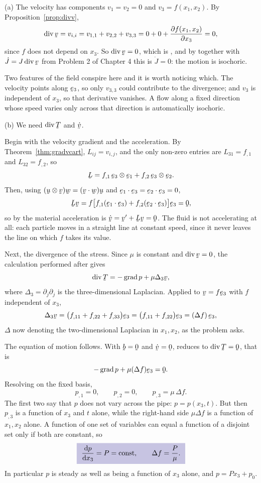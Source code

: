 \begin{solution}
(a) The velocity has components $v_{1}=v_{2}=0$ and
$v_{3}=f(x_{1},x_{2})$. By Proposition~\ref{prop:divv},
\[
   \dvg\bv=v_{i,i}=v_{1,1}+v_{2,2}+v_{3,3}
   =0+0+\frac{\partial f(x_{1},x_{2})}{\partial x_{3}}=0 ,
\]
since $f$ does not depend on $x_{3}$. So $\dvg\bv=0$, which is
, and by  together with $\dot J=J\dvg\bv$ from
Problem 2 of Chapter 4 this is $\dot J=0$: the motion is isochoric.

Two features of the field conspire here and it is worth noticing which.
The velocity points along $\be_{3}$, so only $v_{3,3}$ could contribute
to the divergence; and $v_{3}$ is independent of $x_{3}$, so that
derivative vanishes. A flow along a fixed direction whose speed varies
only across that direction is automatically isochoric.

(b) We need $\dvg\bT$ and $\dot\bv$.

Begin with the velocity gradient and the acceleration. By
Theorem~\ref{thm:gradvcart}, $L_{ij}=v_{i,j}$, and the only non-zero
entries are $L_{31}=f_{,1}$ and $L_{32}=f_{,2}$, so
\[
   \bL=f_{,1}\,\be_{3}\otimes\be_{1}+f_{,2}\,\be_{3}\otimes\be_{2}.
\]
Then, using $(\bu\otimes\bv)\bw=(\ip\bv\bw)\bu$ and
$\ip{\be_{1}}{\be_{3}}=\ip{\be_{2}}{\be_{3}}=0$,
\[
   \bL\bv=f\big[f_{,1}(\ip{\be_{1}}{\be_{3}})
   +f_{,2}(\ip{\be_{2}}{\be_{3}})\big]\be_{3}=\bze ,
\]
so by  the material acceleration is
$\dot\bv=\bv'+\bL\bv=\bze$. The fluid is not accelerating at all: each
particle moves in a straight line at constant speed, since it never
leaves the line on which $f$ takes its value.

Next, the divergence of the stress. Since $\mu$ is constant and
$\dvg\bv=0$, the calculation performed after  gives
\[
   \dvg\bT=-\grad p+\mu\Delta_{3}\bv ,
\]
where $\Delta_{3}=\partial_{j}\partial_{j}$ is the three-dimensional
Laplacian. Applied to $\bv=f\be_{3}$ with $f$ independent of $x_{3}$,
\[
   \Delta_{3}\bv=\big(f_{,11}+f_{,22}+f_{,33}\big)\be_{3}
   =\big(f_{,11}+f_{,22}\big)\be_{3}=(\Delta f)\,\be_{3},
\]
$\Delta$ now denoting the two-dimensional Laplacian in $x_{1},x_{2}$, as
the problem asks.

The equation of motion follows. With $\bb=\bze$ and $\dot\bv=\bze$,
 reduces to $\dvg\bT=\bze$, that is
\[
   -\grad p+\mu(\Delta f)\be_{3}=\bze .
\]
Resolving on the fixed basis,
\[
   p_{,1}=0,\qquad p_{,2}=0,\qquad p_{,3}=\mu\,\Delta f .
\]
The first two say that $p$ does not vary across the pipe:
$p=p(x_{3},t)$. But then $p_{,3}$ is a function of $x_{3}$ and $t$
alone, while the right-hand side $\mu\Delta f$ is a function of
$x_{1},x_{2}$ alone. A function of one set of variables can equal a
function of a disjoint set only if both are constant, so
\[
   \boxed{\ \frac{\dl p}{\dl x_{3}}=P=\text{const},
   \qquad \Delta f=\frac{P}{\mu}. \ }
\]
In particular $p$ is steady as well as being a function of $x_{3}$
alone, and $p=Px_{3}+p_{0}$.


\end{solution}
